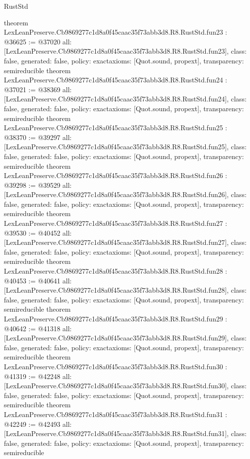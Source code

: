 \begin{lexlean}{RustStd}
\begin{coremodule}
{}
theorem LexLeanPreserve.Cb9869277c1d8a0f45caac35f73abb3d8.R8.RustStd.fun23 : @36625 := @37020 {
  all: [LexLeanPreserve.Cb9869277c1d8a0f45caac35f73abb3d8.R8.RustStd.fun23],
  class: false,
  generated: false,
  policy: exact{axioms: [Quot.sound, propext]},
  transparency: semireducible
}
theorem LexLeanPreserve.Cb9869277c1d8a0f45caac35f73abb3d8.R8.RustStd.fun24 : @37021 := @38369 {
  all: [LexLeanPreserve.Cb9869277c1d8a0f45caac35f73abb3d8.R8.RustStd.fun24],
  class: false,
  generated: false,
  policy: exact{axioms: [Quot.sound, propext]},
  transparency: semireducible
}
theorem LexLeanPreserve.Cb9869277c1d8a0f45caac35f73abb3d8.R8.RustStd.fun25 : @38370 := @39297 {
  all: [LexLeanPreserve.Cb9869277c1d8a0f45caac35f73abb3d8.R8.RustStd.fun25],
  class: false,
  generated: false,
  policy: exact{axioms: [Quot.sound, propext]},
  transparency: semireducible
}
theorem LexLeanPreserve.Cb9869277c1d8a0f45caac35f73abb3d8.R8.RustStd.fun26 : @39298 := @39529 {
  all: [LexLeanPreserve.Cb9869277c1d8a0f45caac35f73abb3d8.R8.RustStd.fun26],
  class: false,
  generated: false,
  policy: exact{axioms: [Quot.sound, propext]},
  transparency: semireducible
}
theorem LexLeanPreserve.Cb9869277c1d8a0f45caac35f73abb3d8.R8.RustStd.fun27 : @39530 := @40452 {
  all: [LexLeanPreserve.Cb9869277c1d8a0f45caac35f73abb3d8.R8.RustStd.fun27],
  class: false,
  generated: false,
  policy: exact{axioms: [Quot.sound, propext]},
  transparency: semireducible
}
theorem LexLeanPreserve.Cb9869277c1d8a0f45caac35f73abb3d8.R8.RustStd.fun28 : @40453 := @40641 {
  all: [LexLeanPreserve.Cb9869277c1d8a0f45caac35f73abb3d8.R8.RustStd.fun28],
  class: false,
  generated: false,
  policy: exact{axioms: [Quot.sound, propext]},
  transparency: semireducible
}
theorem LexLeanPreserve.Cb9869277c1d8a0f45caac35f73abb3d8.R8.RustStd.fun29 : @40642 := @41318 {
  all: [LexLeanPreserve.Cb9869277c1d8a0f45caac35f73abb3d8.R8.RustStd.fun29],
  class: false,
  generated: false,
  policy: exact{axioms: [Quot.sound, propext]},
  transparency: semireducible
}
theorem LexLeanPreserve.Cb9869277c1d8a0f45caac35f73abb3d8.R8.RustStd.fun30 : @41319 := @42248 {
  all: [LexLeanPreserve.Cb9869277c1d8a0f45caac35f73abb3d8.R8.RustStd.fun30],
  class: false,
  generated: false,
  policy: exact{axioms: [Quot.sound, propext]},
  transparency: semireducible
}
theorem LexLeanPreserve.Cb9869277c1d8a0f45caac35f73abb3d8.R8.RustStd.fun31 : @42249 := @42493 {
  all: [LexLeanPreserve.Cb9869277c1d8a0f45caac35f73abb3d8.R8.RustStd.fun31],
  class: false,
  generated: false,
  policy: exact{axioms: [Quot.sound, propext]},
  transparency: semireducible
}
\end{coremodule}
\end{lexlean}
